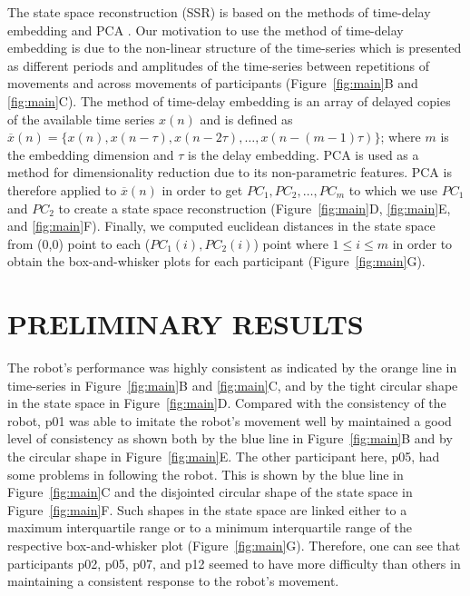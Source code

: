 \documentclass{sig-alternate-05-2015}
\begin{document}
The state space reconstruction (SSR) is based on the methods of time-delay embedding and PCA \cite{Gibson1992}.
Our motivation to use the method of time-delay embedding
is due to the non-linear structure of the time-series
which is 
presented 
as
different periods and amplitudes of the time-series 
between repetitions of movements and across movements of participants (Figure~\ref{fig:main}B and \ref{fig:main}C).
The method of time-delay embedding is an array of 
delayed copies of the available time series $x(n)$ and is defined as  
$ \overline{x}(n) = \{  x(n), x(n-\tau), x(n-2\tau), \dots,x(n-(m-1)\tau)\}$;
where $m$ is the embedding dimension and $\tau$ is the delay embedding.
PCA is used as a method for dimensionality reduction due to its non-parametric features.
PCA is therefore applied to $ \overline{x}(n)$ in order to get $PC_1, PC_2, \dots, PC_m$ 
to which we use $PC_1$ and $PC_2$ 
to create a state space reconstruction (Figure~\ref{fig:main}D, \ref{fig:main}E, and \ref{fig:main}F).
Finally, we computed euclidean distances in the state space 
from (0,0) point to each ($PC_1(i),PC_2(i)$) point where $1 \leq i \leq m$
in order to obtain the box-and-whisker plots for each participant (Figure~\ref{fig:main}G).


\section{PRELIMINARY RESULTS}

The robot's performance was highly consistent 
as indicated by the orange line in time-series in Figure~\ref{fig:main}B and \ref{fig:main}C,
and by the tight circular shape in the state space in Figure~\ref{fig:main}D.
Compared with the consistency of the robot, 
p01 was able to imitate the robot's movement well by maintained a good level of consistency
as shown both 
by the blue line in Figure~\ref{fig:main}B and 
by the circular shape in Figure~\ref{fig:main}E.
The other participant here, p05, had some problems in following the robot.
This is shown by the blue line in 
Figure~\ref{fig:main}C and the disjointed circular shape 
of the  state space in Figure~\ref{fig:main}F.
Such shapes in the  state space are linked either 
to a maximum interquartile range
or 
to a minimum interquartile range of the respective box-and-whisker plot (Figure~\ref{fig:main}G).
Therefore, one  can see that participants p02, p05, p07, and p12 seemed
to have more difficulty than others in maintaining a consistent response
to the robot's movement.
\end{document}
